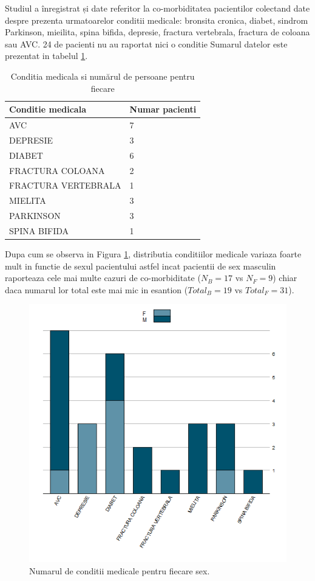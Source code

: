 \documentclass[11pt,draft]{article}
\begin{document}
\begin{multicols}{2}
  Studiul a înregistrat și  date referitor la co-morbiditatea pacientilor colectand date despre prezenta urmatoarelor conditii medicale: bronsita cronica, diabet, sindrom Parkinson, mieilita, spina bifida, depresie, fractura vertebrala, fractura de coloana sau \ac{AVC}. 24 de pacienti nu au raportat nici o conditie Sumarul datelor este prezentat in tabelul \ref{tab:comoSumary}. 
  \begin{table}[H]
    \centering
    \begin{tabular}{ |l|l| }
      \hline
      Conditie medicala & Numar pacienti \\ \hline
      AVC & 7 \\ \hline
      DEPRESIE & 3 \\ \hline
      DIABET & 6 \\ \hline
      FRACTURA COLOANA & 2 \\ \hline
      FRACTURA VERTEBRALA & 1 \\ \hline
      MIELITA & 3 \\ \hline
      PARKINSON & 3 \\ \hline
      SPINA BIFIDA & 1 \\ \hline
    \end{tabular}
    \caption{Conditia medicala si numărul de persoane pentru fiecare}
    \label{tab:comoSumary}
  \end{table}
  Dupa cum se observa in Figura \ref{fig:incoComoCntBySex}, distributia conditiilor medicale variaza foarte mult in functie de sexul pacientului astfel incat pacientii de sex masculin raporteaza cele mai multe cazuri de co-morbiditate ($N_B=17$ vs $N_F=9$) chiar daca numarul lor total este mai mic in esantion ($Total_B=19$ vs $Total_F=31$).
  \begin{figure}[H]
    \centering
    \includegraphics[width=0.8\linewidth]{incoComoCntBySex}
    \caption{Numarul de conditii medicale pentru fiecare sex. }
    \label{fig:incoComoCntBySex}
  \end{figure}


\end{multicols}
\end{document}
